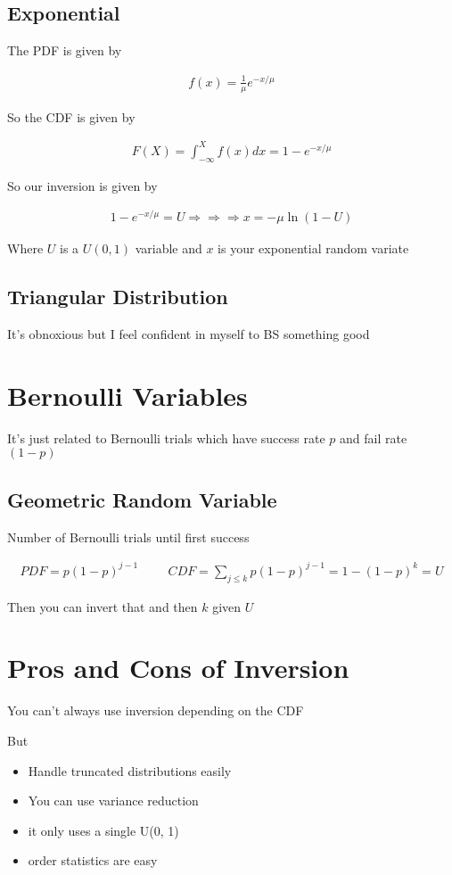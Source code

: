 \documentclass[fleqn]{report}
\newcommand{\hp}{\hspace{1cm}}
\newcommand{\equations} [1] {
\begin{gather*}
#1
\end{gather*}
}
\begin{document}
\subsection{Exponential}

The PDF is given by 
\equations{
    f(x) = \frac{1}{\mu} e^{-x / \mu}
}
So the CDF is given by 

\equations{
    F(X)
    =
    \int^{X}_{- \infty} f(x) dx 
    =
    1 - e^{-x / \mu}
}

So our inversion is given by 
\equations{
    1 - e^{-x / \mu}
    =
    U 
    \Rightarrow
    \Rightarrow
    \Rightarrow
    x 
    =
    -\mu \ln(1 - U)
}

Where $U$ is a $U(0, 1)$ variable and $x$ is your exponential random variate 

\subsection{Triangular Distribution}
It's obnoxious but I feel confident in myself to BS something good 

\section{Bernoulli Variables}
It's just related to Bernoulli trials which have success rate $p$ and fail rate 
$(1 - p)$ 

\subsection{Geometric Random Variable}
Number of Bernoulli trials until first success 

\equations{
    PDF 
    =
    p (1 - p)^{j - 1}
    \hp 
    CDF 
    =
    \sum_{j \leq k}
    p (1 - p)^{j - 1}
    =
    1 - (1 - p)^k = U
}

Then you can invert that and then $k$ given $U$ 

\section{Pros and Cons of Inversion}
You can't always use inversion depending on the CDF 

But 

\begin{itemize}
    \item 
    Handle truncated distributions easily 
    \item 
    You can use variance reduction 
    \item 
    it only uses a single U(0, 1)
    \item 
    order statistics are easy 
\end{itemize}
\end{document}
